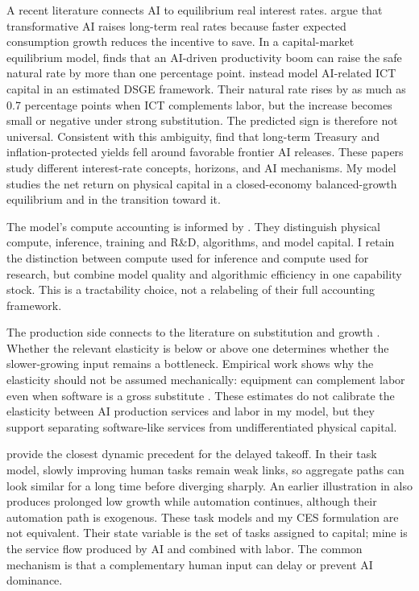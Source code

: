 A recent literature connects AI to equilibrium real interest rates.
\citet{chowhalperinmazlish2026} argue that transformative AI raises long-term
real rates because faster expected consumption growth reduces the incentive to
save. In a capital-market equilibrium model, \citet{rachel2025} finds that an
AI-driven productivity boom can raise the safe natural rate by more than one
percentage point. \citet{melinavilla2025} instead model AI-related ICT capital
in an estimated DSGE framework. Their natural rate rises by as much as 0.7
percentage points when ICT complements labor, but the increase becomes small or
negative under strong substitution. The predicted sign is therefore not
universal. Consistent with this ambiguity, \citet{andrewsfarboodi2025} find that
long-term Treasury and inflation-protected yields fell around favorable frontier
AI releases. These papers study different interest-rate concepts, horizons, and
AI mechanisms. My model studies the net return on physical capital in a
closed-economy balanced-growth equilibrium and in the transition toward it.

The model's compute accounting is informed by \citet{korinekmckelvey2026}. They
distinguish physical compute, inference, training and R\&D, algorithms, and model
capital. I retain the distinction between compute used for inference and compute
used for research, but combine model quality and algorithmic efficiency in one
capability stock. This is a tractability choice, not a relabeling of their full
accounting framework.

The production side connects to the literature on substitution and growth
\citep{pitchford1960,jonesmanuelli1990,rebelo1991}. Whether the relevant
elasticity is below or above one determines whether the slower-growing input
remains a bottleneck. Empirical work shows why the elasticity should not be
assumed mechanically: equipment can complement labor even when software is a
gross substitute \citep{duffypapageorgiou2000,aumshin2024}. These estimates do
not calibrate the elasticity between AI production services and labor in my model, but they support separating
software-like services from undifferentiated physical capital.

\citet{jonestonetti2026} provide the closest dynamic precedent for the delayed
takeoff. In their task model, slowly improving human tasks remain weak links, so
aggregate paths can look similar for a long time before diverging sharply. An
earlier illustration in \citet{aghionjonesjones2019} also produces prolonged low
growth while automation continues, although their automation path is exogenous.
These task models and my CES formulation are not equivalent. Their state variable
is the set of tasks assigned to capital; mine is the service flow produced by AI
and combined with labor. The common mechanism is that a complementary human input
can delay or prevent AI dominance.

